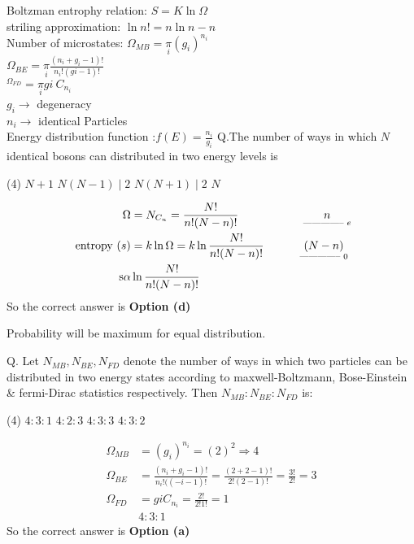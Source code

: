 \newpage
Boltzman entrophy relation: $S=K \ln \Omega$\\
striling approximation: $\ln n !=n \ln n-n$\\
Number of microstates: 
$\Omega_{M B}=\underset{i}{\pi}\left(g_{i}\right)^{n_{i}}$\\
$\Omega_{B E}=\underset{i}{\pi}\frac{\left(n_{i}+g_{i}-1\right) !}{n_{i} !(g i-1) !}$\\
${ }^{\Omega_{F D}}=\underset{i}{\pi}{g i }\  C_{n_{i}}$\\
$g_{i} \rightarrow$ degeneracy\\
$n_{i} \rightarrow$ identical Particles\\
Energy distribution function :$f(E)=\frac{n_{i}}{g_{i}}$
Q.The number of ways in which $N$ identical bosons can distributed in two energy levels is 
 \begin{tasks}(4)
	\task[\textbf{a.}] $N+1$
	\task[\textbf{b.}]$N(N-1) \mid 2$
	\task[\textbf{c.}]$N(N+1) \mid 2$
	\task[\textbf{d.}]$N$ 
\end{tasks}
\begin{answer}
	\begin{align*}
	\Omega&=N_ {C_n}=\frac{N !}{n !(N-n) !}\hspace{2cm}\underset{\text{-------------- }e}{n}\\
	\text { entropy }(s)&=k \ln \Omega=k \ln \frac{N !}{n !(N-n) !}\hspace{1.1cm}\underset{\text{-------------- } 0}{(N-n)}\\
	\operatorname{s\alpha } &\ln \frac{N !}{n !(N-n) !}
	\end{align*}
		So the correct answer is \textbf{Option (d)}
\end{answer}
\begin{note}
	Probability will be maximum for equal distribution.
\end{note}
Q. Let $N_{M B}, N_{B E}, N_{F D}$ denote the number of ways in which two particles can be distributed in two energy states according to maxwell-Boltzmann, Bose-Einstein \& fermi-Dirac statistics respectively. Then $N_{M B}: N_{B E}: N_{F D}$ is:
 \begin{tasks}(4)
	\task[\textbf{a.}]$4: 3: 1$
	\task[\textbf{b.}] $4: 2: 3$
	\task[\textbf{c.}]$4: 3: 3$
	\task[\textbf{d.}] $4: 3: 2$
\end{tasks}
\begin{answer}
	\begin{align*}
	\Omega_{M B}&=\left(g_{i}\right)^{n_{i}}=(2)^{2} \Rightarrow 4 \\
	\Omega_{B E}&=\frac{\left(n_{i}+g_{i}-1\right) !}{n_{i} !((-i-1) !}=\frac{(2+2-1) !}{2 !(2-1) !}=\frac{3 !}{2 !}=3\\
	\Omega_{F D}&=g i C_{n_{i}}=\frac{2 !}{2 ! 1 !}=1\\
	&4:3:1
	\end{align*}
	So the correct answer is \textbf{Option (a)}
\end{answer}
